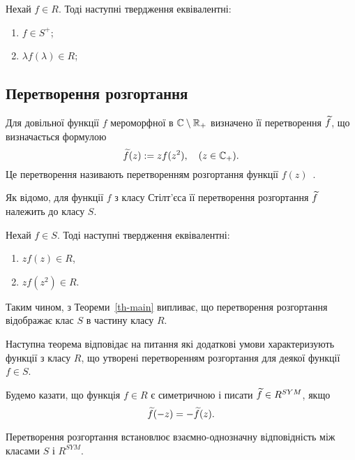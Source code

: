 \begin{theorem}\label{th-preMain}
	Нехай $f\in R$. Тоді наступні твердження еквівалентні:
	\begin{enumerate}
		\item $f\in S^+$;
		\item $\lambda f(\lambda)\in R$;
	\end{enumerate}
\end{theorem}


\subsection{Перетворення розгортання}

Для довільної функції $f$ мероморфної в $\mathbb{C}\setminus \mathbb{R}_+$ визначено її перетворення $\widetilde f$, що визначається формулою
\begin{equation} \label{eq-Turn}
	\widetilde f(z) := zf(z^2), \quad (z\in\mathbb{C}_+).
\end{equation}
Це перетворення називають перетворенням розгортання функції $f(z)$~\cite{KalWinWor2006,DerKov2015}.

Як відомо, для функції $f$ з класу Стілт'єса її перетворення розгортання $\widetilde f$ належить до класу $S$.

\begin{theorem}\label{th-main}
	 Нехай $f\in S$. Тоді наступні твердження еквівалентні:
	 \begin{enumerate}
	 	\item $zf(z)\in R$,
	 	\item $zf(z^2)\in R$.
	 \end{enumerate}
\end{theorem}

Таким чином, з Теореми~\ref{th-main} випливає, що перетворення розгортання відображає клас $S$ в частину класу $R$.

Наступна теорема відповідає на питання які додаткові умови характеризують функції з класу $R$, що утворені перетворенням розгортання для деякої функції $f\in S$.

\begin{definition}
	Будемо казати, що функція $f\in R$ є симетричною і писати $\widetilde f\in R^{SYM}$, якщо
	\begin{equation} \label{eq-SYM}
	 	\widetilde f(-z) = -\widetilde f(z).
	 \end{equation} 
\end{definition}

\begin{theorem}
	 Перетворення розгортання встановлює взаємно-однозначну відповідність між класами $S$ і $R^{SYM}$.
\end{theorem}


